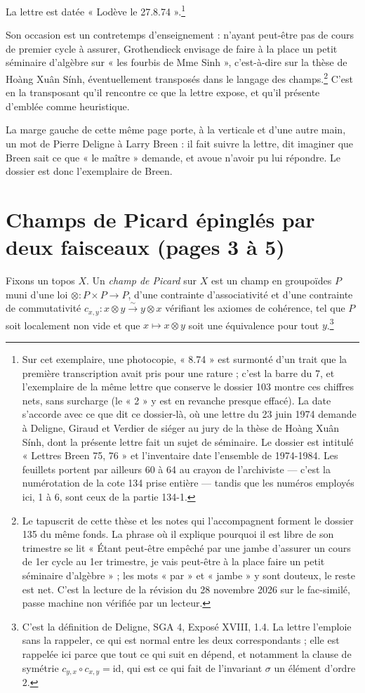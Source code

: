 \documentclass[11pt,a4paper]{article}
\begin{document}
La lettre est datée « Lodève le 27.8.74 ».\footnote{Sur cet exemplaire, une
photocopie, « 8.74 » est surmonté d'un trait que la première transcription
avait pris pour une rature ; c'est la barre du 7, et l'exemplaire de la même
lettre que conserve le dossier 103 montre ces chiffres nets, sans surcharge
(le « 2 » y est en revanche presque effacé). La date s'accorde avec ce que
dit ce dossier-là, où une lettre du 23 juin 1974 demande à Deligne, Giraud et
Verdier de siéger au jury de la thèse de Hoàng Xuân Sính, dont la présente
lettre fait un sujet de séminaire. Le dossier est intitulé « Lettres Breen 75,
76 » et l'inventaire date l'ensemble de 1974-1984. Les
feuillets portent par ailleurs 60 à 64 au crayon de l'archiviste --- c'est la
numérotation de la cote 134 prise entière --- tandis que les numéros employés
ici, 1 à 6, sont ceux de la partie 134-1.}

Son occasion est un contretemps d'enseignement : n'ayant peut-être pas de
cours de premier cycle à assurer, Grothendieck envisage de faire à la place un
petit séminaire d'algèbre sur « les fourbis de Mme Sinh », c'est-à-dire sur la
thèse de Hoàng Xuân Sính, éventuellement transposés dans le langage des
champs.\footnote{Le tapuscrit de cette thèse et les notes qui l'accompagnent
forment le dossier 135 du même fonds. La phrase où il explique pourquoi il
est libre de son trimestre se lit « Étant peut-être empêché par une jambe
d'assurer un cours de 1er cycle au 1er trimestre, je vais peut-être à la place
faire un petit séminaire d'algèbre » ; les mots « par » et « jambe » y sont
douteux, le reste est net. C'est la lecture de la révision du 28 novembre 2026
sur le fac-similé, passe machine non vérifiée par un lecteur.} C'est en la transposant qu'il rencontre ce
que la lettre expose, et qu'il présente d'emblée comme heuristique.

La marge gauche de cette même page porte, à la verticale et d'une autre main,
un mot de Pierre Deligne à Larry Breen : il fait suivre la lettre, dit
imaginer que Breen sait ce que « le maître » demande, et avoue n'avoir pu lui
répondre. Le dossier est donc l'exemplaire de Breen.

\section*{Champs de Picard épinglés par deux faisceaux (pages 3 à 5)}

Fixons un topos $X$. Un \emph{champ de Picard} sur $X$ est un champ en
groupoïdes $P$ muni d'une loi $\otimes : P \times P \to P$, d'une contrainte
d'associativité et d'une contrainte de commutativité
$c_{x,y} : x \otimes y \xrightarrow{\ \sim\ } y \otimes x$ vérifiant les
axiomes de cohérence, tel que $P$ soit localement non vide et que
$x \mapsto x \otimes y$ soit une équivalence pour tout $y$.\footnote{C'est la
définition de Deligne, SGA 4, Exposé XVIII, 1.4. La lettre l'emploie sans la
rappeler, ce qui est normal entre les deux correspondants ; elle est rappelée
ici parce que tout ce qui suit en dépend, et notamment la clause de symétrie
$c_{y,x} \circ c_{x,y} = \mathrm{id}$, qui est ce qui fait de l'invariant
$\sigma$ un élément d'ordre $2$.}
\end{document}
